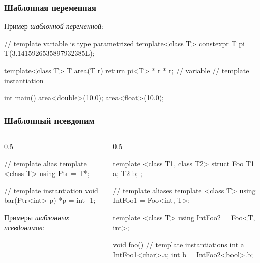 \documentclass[compress, 8pt, aspectratio=169]{beamer}
\begin{document}
  \begin{frame}[fragile]

    \frametitle{Шаблонная переменная}

    Пример \textit{шаблонной переменной}\footnotemark{}:


    \begin{myinplacelisting}[minted language=cpp]
// template variable is type parametrized
template<class T>
constexpr T pi = T(3.1415926535897932385L);

template<class T>
T area(T r)
{
    return pi<T> * r * r; // variable
                          // template instantiation
}

int main() {
    area<double>(10.0);
    area<float>(10.0);
}
    \end{myinplacelisting}

  \end{frame}

  \begin{frame}[fragile]

    \frametitle{Шаблонный псевдоним}

    \begin{columns}[T]

      \begin{column}{0.5\textwidth}

        \begin{myinplacelisting}[minted language=cpp]
// template alias
template <class T>
using Ptr = T*;

// template instantiation
void bar(Ptr<int> p) {
    *p = int {-1};
}
        \end{myinplacelisting}

        Примеры \textit{шаблонных псевдонимов}\footnotemark{}:


      \end{column}
      
      \begin{column}{0.5\textwidth}

        \begin{myinplacelisting}[minted language=cpp]
template <class T1, class T2>
struct Foo {
    T1 a;
    T2 b;
};

// template aliases
template <class T>
using IntFoo1 = Foo<int, T>;

template <class T>
using IntFoo2 = Foo<T, int>;

void foo() {
    // template instantiations
    int a = IntFoo1<char>{}.a;
    int b = IntFoo2<bool>{}.b;
}
        \end{myinplacelisting}

      \end{column}

    \end{columns}

  \end{frame}
\end{document}
